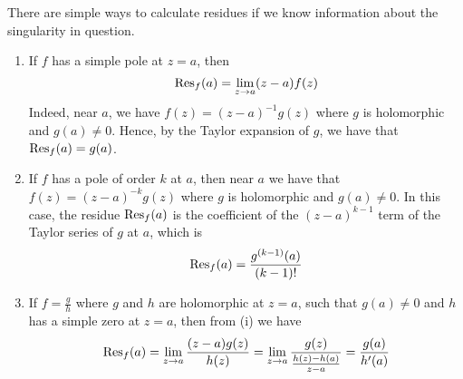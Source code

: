 There are simple ways to calculate residues if we know information about the singularity in question.
\begin{enumerate}
	\item If \( f \) has a simple pole at \( z = a \), then
	\[ \Res_f(a) = \lim_{z \to a} (z-a) f(z) \]
	Indeed, near \( a \), we have \( f(z) = (z-a)^{-1} g(z) \) where \( g \) is holomorphic and \( g(a) \neq 0 \).
	Hence, by the Taylor expansion of \( g \), we have that \( \Res_f(a) = g(a) \).
	\item If \( f \) has a pole of order \( k \) at \( a \), then near \( a \) we have that \( f(z) = (z-a)^{-k} g(z) \) where \( g \) is holomorphic and \( g(a) \neq 0 \).
	In this case, the residue \( \Res_f(a) \) is the coefficient of the \( (z-a)^{k-1} \) term of the Taylor series of \( g \) at \( a \), which is
	\[ \Res_f(a) = \frac{g^{(k-1)}(a)}{(k-1)!} \]
	\item If \( f = \frac{g}{h} \) where \( g \) and \( h \) are holomorphic at \( z = a \), such that \( g(a) \neq 0 \) and \( h \) has a simple zero at \( z = a \), then from (i) we have
	\[ \Res_f(a) = \lim_{z \to a} \frac{(z-a)g(z)}{h(z)} = \lim_{z \to a} \frac{g(z)}{\frac{h(z) - h(a)}{z-a}} = \frac{g(a)}{h'(a)} \]
\end{enumerate}
